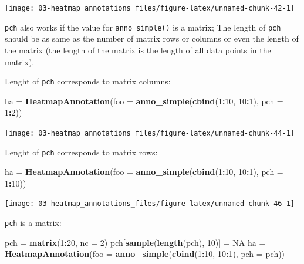 \documentclass[]{book}
\newenvironment{Shaded}{\begin{snugshade}}{\end{snugshade}}
\newcommand{\KeywordTok}[1]{\textcolor[rgb]{0.13,0.29,0.53}{\textbf{#1}}}
\newcommand{\DataTypeTok}[1]{\textcolor[rgb]{0.13,0.29,0.53}{#1}}
\newcommand{\DecValTok}[1]{\textcolor[rgb]{0.00,0.00,0.81}{#1}}
\newcommand{\StringTok}[1]{\textcolor[rgb]{0.31,0.60,0.02}{#1}}
\newcommand{\OtherTok}[1]{\textcolor[rgb]{0.56,0.35,0.01}{#1}}
\newcommand{\OperatorTok}[1]{\textcolor[rgb]{0.81,0.36,0.00}{\textbf{#1}}}
\newcommand{\NormalTok}[1]{#1}
\theoremstyle{definition}
\theoremstyle{definition}
\theoremstyle{definition}
\theoremstyle{remark}
\begin{document}
\begin{center}\texttt{[image: 03-heatmap\_annotations\_files/figure-latex/unnamed-chunk-42-1]} \end{center}

\texttt{pch} also works if the value for \texttt{anno\_simple()} is a
matrix; The length of \texttt{pch} should be as same as the number of
matrix rows or columns or even the length of the matrix (the length of
the matrix is the length of all data points in the matrix).

Lenght of \texttt{pch} corresponds to matrix columns:

\begin{Shaded}
\begin{Highlighting}[]
\NormalTok{ha =}\StringTok{ }\KeywordTok{HeatmapAnnotation}\NormalTok{(}\DataTypeTok{foo =} \KeywordTok{anno_simple}\NormalTok{(}\KeywordTok{cbind}\NormalTok{(}\DecValTok{1}\OperatorTok{:}\DecValTok{10}\NormalTok{, }\DecValTok{10}\OperatorTok{:}\DecValTok{1}\NormalTok{), }\DataTypeTok{pch =} \DecValTok{1}\OperatorTok{:}\DecValTok{2}\NormalTok{))}
\end{Highlighting}
\end{Shaded}

\begin{center}\texttt{[image: 03-heatmap\_annotations\_files/figure-latex/unnamed-chunk-44-1]} \end{center}

Lenght of \texttt{pch} corresponds to matrix rows:

\begin{Shaded}
\begin{Highlighting}[]
\NormalTok{ha =}\StringTok{ }\KeywordTok{HeatmapAnnotation}\NormalTok{(}\DataTypeTok{foo =} \KeywordTok{anno_simple}\NormalTok{(}\KeywordTok{cbind}\NormalTok{(}\DecValTok{1}\OperatorTok{:}\DecValTok{10}\NormalTok{, }\DecValTok{10}\OperatorTok{:}\DecValTok{1}\NormalTok{), }\DataTypeTok{pch =} \DecValTok{1}\OperatorTok{:}\DecValTok{10}\NormalTok{))}
\end{Highlighting}
\end{Shaded}

\begin{center}\texttt{[image: 03-heatmap\_annotations\_files/figure-latex/unnamed-chunk-46-1]} \end{center}

\texttt{pch} is a matrix:

\begin{Shaded}
\begin{Highlighting}[]
\NormalTok{pch =}\StringTok{ }\KeywordTok{matrix}\NormalTok{(}\DecValTok{1}\OperatorTok{:}\DecValTok{20}\NormalTok{, }\DataTypeTok{nc =} \DecValTok{2}\NormalTok{)}
\NormalTok{pch[}\KeywordTok{sample}\NormalTok{(}\KeywordTok{length}\NormalTok{(pch), }\DecValTok{10}\NormalTok{)] =}\StringTok{ }\OtherTok{NA}
\NormalTok{ha =}\StringTok{ }\KeywordTok{HeatmapAnnotation}\NormalTok{(}\DataTypeTok{foo =} \KeywordTok{anno_simple}\NormalTok{(}\KeywordTok{cbind}\NormalTok{(}\DecValTok{1}\OperatorTok{:}\DecValTok{10}\NormalTok{, }\DecValTok{10}\OperatorTok{:}\DecValTok{1}\NormalTok{), }\DataTypeTok{pch =}\NormalTok{ pch))}
\end{Highlighting}
\end{Shaded}
\end{document}
